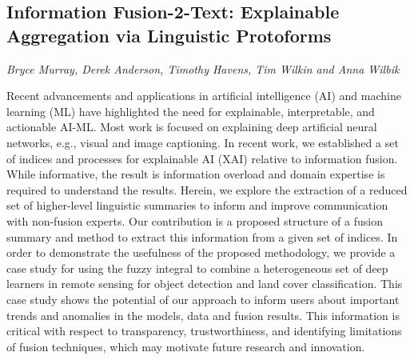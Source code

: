\documentclass[../booklet.tex]{subfiles}
\begin{document}
\subsection[Information Fusion-2-Text: Explainable Aggregation via Linguistic Protoforms. {\it Bryce Murray, Derek Anderson, Timothy Havens, Tim Wilkin and Anna Wilbik}]{Information Fusion-2-Text: Explainable Aggregation via Linguistic Protoforms}
    

\begin{center}
  {\it Bryce Murray, Derek Anderson, Timothy Havens, Tim Wilkin and Anna Wilbik}
\end{center}

\vskip 0.8cm



Recent advancements and applications in artificial intelligence (AI) and machine learning (ML) have highlighted the need for explainable, interpretable, and actionable AI-ML. Most work is focused on explaining deep artificial neural networks, e.g., visual and image captioning. In recent work, we established a set of indices and processes for explainable AI (XAI) relative to information fusion. While informative, the result is information overload and domain expertise is required to understand the results. Herein, we explore the extraction of a reduced set of higher-level linguistic summaries to inform and improve communication with non-fusion experts. Our contribution is a proposed structure of a fusion summary and method to extract this information from a given set of indices. In order to demonstrate the usefulness of the proposed methodology, we provide a case study for using the fuzzy integral to combine a heterogeneous set of deep learners in remote sensing for object detection and land cover classification.
This case study shows the potential of our approach to inform users about important trends and anomalies in the models, data and fusion results. This information is critical with respect to transparency, trustworthiness, and identifying limitations of fusion techniques, which may motivate future research and innovation.

\end{document}
